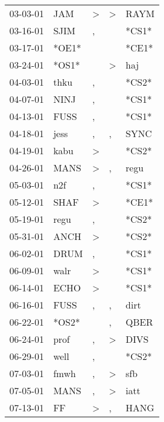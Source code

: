 \begin{supertabular}{lllll}
 03-03-01 &    JAM &     \textgreater &     \textgreater &   RAYM \\
 03-16-01 &   SJIM &                , &                  &  *CS1* \\
 03-17-01 &  *OE1* &                  &                  &  *CE1* \\
 03-24-01 &  *OS1* &                  &     \textgreater &    haj \\
 04-03-01 &   thku &                , &                  &  *CS2* \\
 04-07-01 &   NINJ &                , &                  &  *CS1* \\
 04-13-01 &   FUSS &                , &                  &  *CS1* \\
 04-18-01 &   jess &                , &                , &   SYNC \\
 04-19-01 &   kabu &     \textgreater &                  &  *CS2* \\
 04-26-01 &   MANS &     \textgreater &                , &   regu \\
 05-03-01 &    n2f &                , &                  &  *CS1* \\
 05-12-01 &   SHAF &     \textgreater &                  &  *CE1* \\
 05-19-01 &   regu &                , &                  &  *CS2* \\
 05-31-01 &   ANCH &     \textgreater &                  &  *CS2* \\
 06-02-01 &   DRUM &                , &                  &  *CS1* \\
 06-09-01 &   walr &     \textgreater &                  &  *CS1* \\
 06-14-01 &   ECHO &     \textgreater &                  &  *CS1* \\
 06-16-01 &   FUSS &                , &                , &   dirt \\
 06-22-01 &  *OS2* &                  &                , &   QBER \\
 06-24-01 &   prof &                , &     \textgreater &   DIVS \\
 06-29-01 &   well &                , &                  &  *CS2* \\
 07-03-01 &   fmwh &                , &     \textgreater &    sfb \\
 07-05-01 &   MANS &                , &     \textgreater &   iatt \\
 07-13-01 &     FF &     \textgreater &                , &   HANG \\

\end{supertabular}
